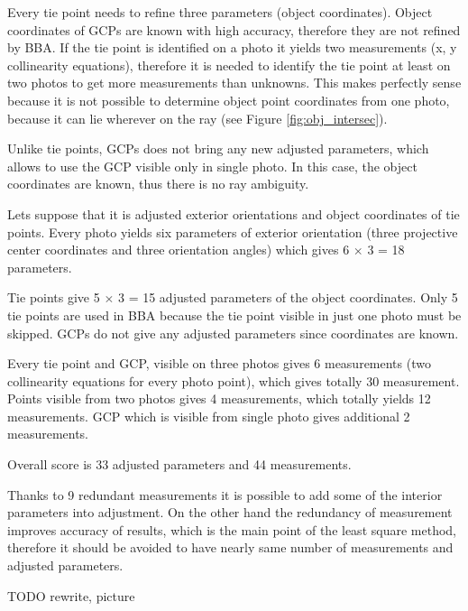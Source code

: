 \documentclass[a4paper,12pt]{article}
\begin{document}

Every tie point needs to refine three parameters (object coordinates). 
Object coordinates of GCPs are known with high accuracy, therefore they are not refined by BBA. 
If the tie point is identified on a photo it yields two measurements (x, y collinearity equations), 
therefore it is needed to identify the tie point at least on two photos to get more measurements 
than unknowns. This makes perfectly sense because it is not possible to determine object point coordinates from one photo,
because it can lie wherever on the ray (see Figure \ref{fig:obj_intersec}).

Unlike tie points, GCPs does not bring any new adjusted parameters, which 
allows to use the GCP visible only in single photo. In this case, the object coordinates 
are known, thus there is no ray ambiguity. 

Lets suppose that it is adjusted exterior orientations and object coordinates of tie points.  
Every photo yields six parameters of exterior orientation (three projective center coordinates and three orientation angles) 
which gives 6 $\times$ 3 = 18 parameters. 

Tie points give 5 $\times$ 3 = 15 adjusted parameters of the object coordinates. 
Only 5 tie points are used in BBA because the tie point visible in just one photo must be skipped.
GCPs do not give any adjusted parameters since coordinates are known.

Every tie point and GCP, visible on three photos gives 6 measurements (two collinearity equations for every photo point),
which gives totally 30 measurement.
Points visible from two photos gives 4 measurements, which totally yields 12 measurements.
GCP which is visible from single photo gives additional 2 measurements.

Overall score is 33 adjusted parameters and 44 measurements.

Thanks to 9 redundant measurements it is possible to add some of the interior parameters into adjustment.  
On the other hand the redundancy of measurement improves accuracy of results, which is the main point of the least square method,
therefore it should be avoided to have nearly same number of measurements and adjusted parameters.


TODO rewrite, picture
\end{document}
